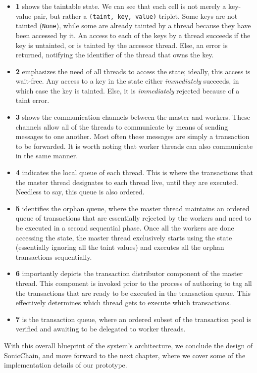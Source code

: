 \begin{itemize}
	\item \textbf{1} shows the taintable state. We can see that each cell is not merely a key-value
	pair, but rather a \texttt{(taint, key, value)} triplet. Some keys are not tainted
	(\texttt{None}), while some are already tainted by a thread because they have been accessed by
	it. An access to each of the keys by a thread succeeds if the key is untainted, or is tainted by
	the accessor thread. Else, an error is returned, notifying the identifier of the thread that owns
	the key.
	\item \textbf{2} emphasizes the need of all threads to access the state; ideally, this access is wait-free. Any access to a key in the
	state either \textit{immediately} succeeds, in which case the key is tainted. Else, it is
	\textit{immediately} rejected because of a taint error.
	\item \textbf{3} shows the communication channels between the master and workers. These channels
	allow all of the threads to communicate by means of sending messages to one another. Most
	often these messages are simply a transaction to be forwarded. It is worth noting that worker
	threads can also communicate in the same manner.
	\item \textbf{4} indicates the local queue of each thread. This is where the transactions that the
	master thread designates to each thread live, until they are executed. Needless to say, this
	queue is also ordered.
	\item \textbf{5} identifies the orphan queue, where the master thread maintains an ordered queue of
	transactions that are essentially rejected by the workers and need to be executed in a second
	sequential phase. Once all the workers are done accessing the state, the master thread
	exclusively starts using the state (essentially ignoring all the taint values) and executes
	all the orphan transactions sequentially.
	\item \textbf{6} importantly depicts the transaction distributor component of the master thread.
	This component is invoked prior to the process of authoring to tag all the transactions that are
	ready to be executed in the transaction queue. This effectively determines which thread gets to
	execute which transactions.
	\item \textbf{7} is the transaction queue, where an ordered subset of the transaction pool is
	verified and awaiting to be delegated to worker threads.
\end{itemize}

With this overall blueprint of the system's architecture, we conclude the design of SonicChain, and move forward to the next chapter, where
we cover some of the implementation details of our prototype.






